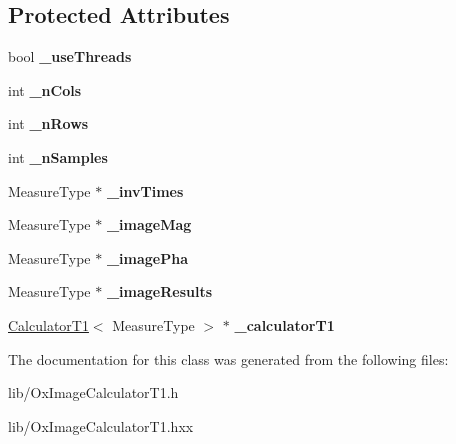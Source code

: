 \subsection*{Protected Attributes}
\begin{DoxyCompactItemize}
\item 
\hypertarget{class_ox_1_1_image_calculator_t1_af5f6e72b63b78a87a3723f4f2d71068f}{bool {\bfseries \-\_\-use\-Threads}}\label{class_ox_1_1_image_calculator_t1_af5f6e72b63b78a87a3723f4f2d71068f}

\item 
\hypertarget{class_ox_1_1_image_calculator_t1_a02ee85ff0ffd7cb5b1de9357ab23ce56}{int {\bfseries \-\_\-n\-Cols}}\label{class_ox_1_1_image_calculator_t1_a02ee85ff0ffd7cb5b1de9357ab23ce56}

\item 
\hypertarget{class_ox_1_1_image_calculator_t1_ab3db79a49b848f1a145e6fcbb9c29766}{int {\bfseries \-\_\-n\-Rows}}\label{class_ox_1_1_image_calculator_t1_ab3db79a49b848f1a145e6fcbb9c29766}

\item 
\hypertarget{class_ox_1_1_image_calculator_t1_af5655b9262c2634cc8b4ce0465682b0e}{int {\bfseries \-\_\-n\-Samples}}\label{class_ox_1_1_image_calculator_t1_af5655b9262c2634cc8b4ce0465682b0e}

\item 
\hypertarget{class_ox_1_1_image_calculator_t1_a6bc67b8020a51ecd2defd7ede1954b52}{Measure\-Type $\ast$ {\bfseries \-\_\-inv\-Times}}\label{class_ox_1_1_image_calculator_t1_a6bc67b8020a51ecd2defd7ede1954b52}

\item 
\hypertarget{class_ox_1_1_image_calculator_t1_ab43aaec5a7bae1246c96f366498c2130}{Measure\-Type $\ast$ {\bfseries \-\_\-image\-Mag}}\label{class_ox_1_1_image_calculator_t1_ab43aaec5a7bae1246c96f366498c2130}

\item 
\hypertarget{class_ox_1_1_image_calculator_t1_af804d044be29f0b554c68992d77f22ba}{Measure\-Type $\ast$ {\bfseries \-\_\-image\-Pha}}\label{class_ox_1_1_image_calculator_t1_af804d044be29f0b554c68992d77f22ba}

\item 
\hypertarget{class_ox_1_1_image_calculator_t1_a62bb966f944eae07d9873db02487f850}{Measure\-Type $\ast$ {\bfseries \-\_\-image\-Results}}\label{class_ox_1_1_image_calculator_t1_a62bb966f944eae07d9873db02487f850}

\item 
\hypertarget{class_ox_1_1_image_calculator_t1_aaca73d6bf596da5766005c0064216b28}{\hyperlink{class_ox_1_1_calculator_t1}{Calculator\-T1}$<$ Measure\-Type $>$ $\ast$ {\bfseries \-\_\-calculator\-T1}}\label{class_ox_1_1_image_calculator_t1_aaca73d6bf596da5766005c0064216b28}

\end{DoxyCompactItemize}


The documentation for this class was generated from the following files\-:\begin{DoxyCompactItemize}
\item 
lib/Ox\-Image\-Calculator\-T1.\-h\item 
lib/Ox\-Image\-Calculator\-T1.\-hxx\end{DoxyCompactItemize}
